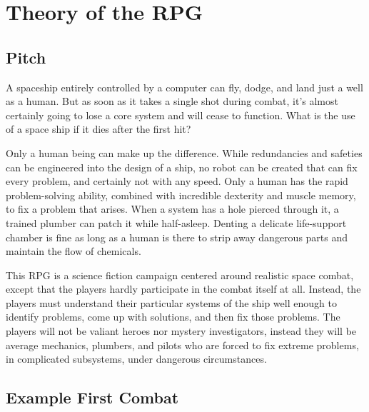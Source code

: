 \documentclass[a4paper]{article}
\begin{document}
\section{Theory of the RPG} \label{theory}

\subsection{Pitch}

A spaceship entirely controlled by a computer can fly, dodge, and land just a well as a human. But as soon as it takes a single shot during combat, it's almost certainly going to lose a core system and will cease to function. What is the use of a space ship if it dies after the first hit?

Only a human being can make up the difference. While redundancies and safeties can be engineered into the design of a ship, no robot can be created that can fix every problem, and certainly not with any speed. Only a human has the rapid problem-solving ability, combined with incredible dexterity and muscle memory, to fix a problem that arises. When a system has a hole pierced through it, a trained plumber can patch it while half-asleep. Denting a delicate life-support chamber is fine as long as a human is there to strip away dangerous parts and maintain the flow of chemicals.

This RPG is a science fiction campaign centered around realistic space combat, except that the players hardly participate in the combat itself at all. Instead, the players must understand their particular systems of the ship well enough to identify problems, come up with solutions, and then fix those problems. The players will not be valiant heroes nor mystery investigators, instead they will be average mechanics, plumbers, and pilots who are forced to fix extreme problems, in complicated subsystems, under dangerous circumstances. 

\subsection{Example First Combat} \label{example_first_combat}
\end{document}
